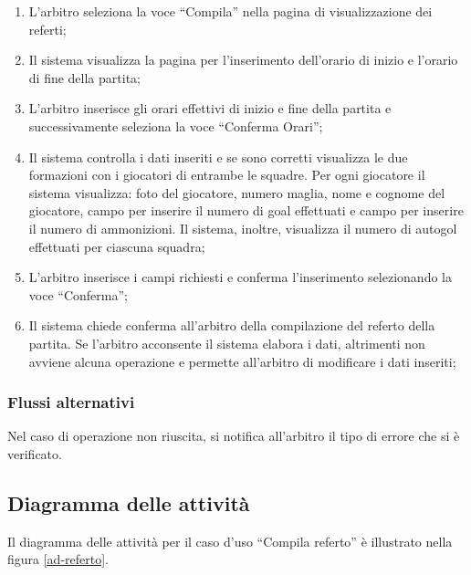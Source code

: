 \begin{enumerate}
	
	\item
	L'arbitro seleziona la voce ``Compila'' nella pagina di visualizzazione dei referti;
	
	\item
	Il sistema visualizza la pagina per l'inserimento dell'orario di inizio e l'orario di fine della partita;
	
	\item
	L'arbitro inserisce gli orari effettivi di inizio e fine della partita e successivamente seleziona la voce ``Conferma Orari'';
	
	\item
	Il sistema controlla i dati inseriti e se sono corretti visualizza le due formazioni con i giocatori di entrambe le squadre. Per ogni giocatore il sistema visualizza: foto del giocatore, numero maglia, nome e cognome del giocatore, campo per inserire il numero di goal effettuati e campo per inserire il numero di ammonizioni. Il sistema, inoltre, visualizza il numero di autogol effettuati per ciascuna squadra;
	
	\item
	L'arbitro inserisce i campi richiesti e conferma l'inserimento selezionando la voce ``Conferma'';
	
	\item
	Il sistema chiede conferma all'arbitro della compilazione del referto della partita. Se l'arbitro acconsente il sistema elabora i dati, altrimenti non avviene alcuna operazione e permette all'arbitro di modificare i dati inseriti;
	
\end{enumerate}

\subsubsection*{Flussi alternativi}
Nel caso di operazione non riuscita, si notifica all'arbitro il tipo di errore che si è verificato.

\subsection*{Diagramma delle attività}
Il diagramma delle attività per il caso d'uso ``Compila referto'' è illustrato nella figura \vref{ad-referto}.



